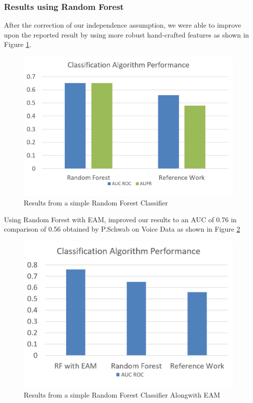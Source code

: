 \subsubsection{Results using Random Forest}
After the correction of our independence assumption, we were able to improve upon the reported result by using more robust hand-crafted features as shown in Figure \ref{fig:first_res}.
\begin{figure}[htbp]
  \centering
  \includegraphics[width=\textwidth]{./Figures/first_res.png}
  \caption{Results from a simple Random Forest Classifier}
  \label{fig:first_res}
\end{figure}
Using Random Forest with EAM, improved our results to an AUC of 0.76 in comparison of 0.56 obtained by P.Schwab \cite{schwab2018phonemd} on Voice Data as shown in Figure \ref{fig:second_res}
\begin{figure}[htbp]
  \centering
  \includegraphics[width=\textwidth]{./Figures/second_res.png}
  \caption{Results from a simple Random Forest Classifier Alongwith EAM}
  \label{fig:second_res}
\end{figure}
